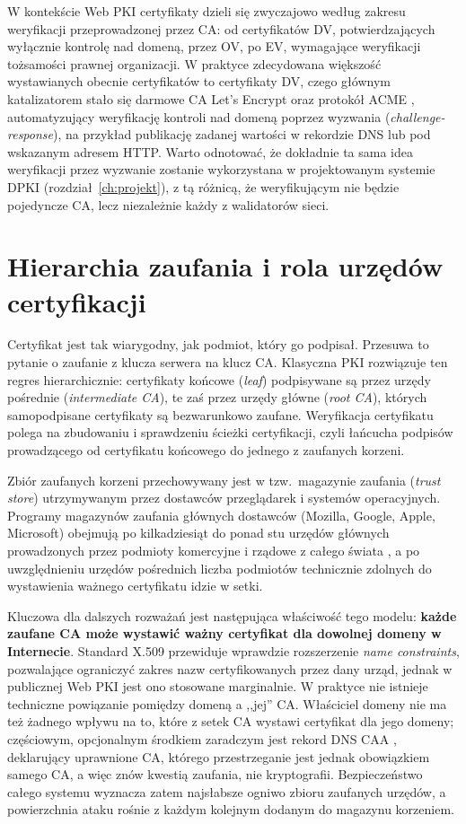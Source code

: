 W kontekście Web PKI certyfikaty dzieli się zwyczajowo według zakresu weryfikacji przeprowadzonej przez CA: od certyfikatów DV, potwierdzających wyłącznie kontrolę nad domeną, przez OV, po EV, wymagające weryfikacji tożsamości prawnej organizacji. W praktyce zdecydowana większość wystawianych obecnie certyfikatów to certyfikaty DV, czego głównym katalizatorem stało się darmowe CA Let's Encrypt oraz protokół ACME \cite{rfc8555}, automatyzujący weryfikację kontroli nad domeną poprzez wyzwania (\emph{challenge-response}), na przykład publikację zadanej wartości w rekordzie DNS lub pod wskazanym adresem HTTP. Warto odnotować, że dokładnie ta sama idea weryfikacji przez wyzwanie zostanie wykorzystana w projektowanym systemie DPKI (rozdział~\ref{ch:projekt}), z tą różnicą, że weryfikującym nie będzie pojedyncze CA, lecz niezależnie każdy z walidatorów sieci.

\section{Hierarchia zaufania i rola urzędów certyfikacji}
\label{sec:hierarchia-zaufania}

Certyfikat jest tak wiarygodny, jak podmiot, który go podpisał. Przesuwa to pytanie o zaufanie z klucza serwera na klucz CA. Klasyczna PKI rozwiązuje ten regres hierarchicznie: certyfikaty końcowe (\emph{leaf}) podpisywane są przez urzędy pośrednie (\emph{intermediate CA}), te zaś przez urzędy główne (\emph{root CA}), których samopodpisane certyfikaty są bezwarunkowo zaufane. Weryfikacja certyfikatu polega na zbudowaniu i sprawdzeniu ścieżki certyfikacji, czyli łańcucha podpisów prowadzącego od certyfikatu końcowego do jednego z zaufanych korzeni.

Zbiór zaufanych korzeni przechowywany jest w tzw.\ magazynie zaufania (\emph{trust store}) utrzymywanym przez dostawców przeglądarek i systemów operacyjnych. Programy magazynów zaufania głównych dostawców (Mozilla, Google, Apple, Microsoft) obejmują po kilkadziesiąt do ponad stu urzędów głównych prowadzonych przez podmioty komercyjne i rządowe z całego świata \cite{mozilla-ca-list}, a po uwzględnieniu urzędów pośrednich liczba podmiotów technicznie zdolnych do wystawienia ważnego certyfikatu idzie w setki.

Kluczowa dla dalszych rozważań jest następująca właściwość tego modelu: \textbf{każde zaufane CA może wystawić ważny certyfikat dla dowolnej domeny w Internecie}. Standard X.509 przewiduje wprawdzie rozszerzenie \emph{name constraints}, pozwalające ograniczyć zakres nazw certyfikowanych przez dany urząd, jednak w publicznej Web PKI jest ono stosowane marginalnie. W praktyce nie istnieje techniczne powiązanie pomiędzy domeną a ,,jej'' CA. Właściciel domeny nie ma też żadnego wpływu na to, które z setek CA wystawi certyfikat dla jego domeny; częściowym, opcjonalnym środkiem zaradczym jest rekord DNS CAA \cite{rfc8659}, deklarujący uprawnione CA, którego przestrzeganie jest jednak obowiązkiem samego CA, a więc znów kwestią zaufania, nie kryptografii. Bezpieczeństwo całego systemu wyznacza zatem najsłabsze ogniwo zbioru zaufanych urzędów, a powierzchnia ataku rośnie z każdym kolejnym dodanym do magazynu korzeniem.

